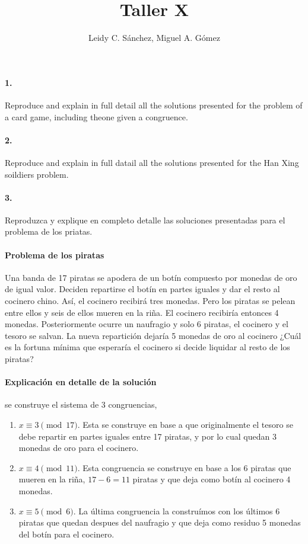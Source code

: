 \documentclass{article}
\begin{document}
	\title{Taller X}
	\author{Leidy C. Sánchez, Miguel A. Gómez}
	\maketitle

\paragraph{1.} Reproduce and explain in full detail all the solutions presented for the problem of a card game, including theone given a congruence.

\paragraph{2.} Reproduce and explain in full datail all the solutions presented for the Han Xing soildiers problem.

\paragraph{3.}  Reproduzca y explique en completo detalle las soluciones presentadas para el problema de los priatas.

\paragraph{Problema de los piratas} Una banda de 17 piratas se apodera de un botín compuesto por monedas de oro de igual valor. Deciden repartirse el botín en partes iguales y dar el resto al cocinero chino. Así, el cocinero recibirá tres monedas. Pero los piratas se pelean entre ellos y seis de ellos mueren en la riña. El cocinero recibiría entonces 4 monedas. Posteriormente ocurre un naufragio y solo 6 piratas, el cocinero y el tesoro se salvan. La nueva repartición dejaría 5 monedas de oro al cocinero ¿Cuál es la fortuna mínima que esperaría el cocinero si decide liquidar al resto de los piratas?

\paragraph{Explicación en detalle de la solución} se construye el sistema de 3 congruencias,

\begin{enumerate}
    \item $x \equiv 3 \pmod{17}$. Esta se construye en base a que originalmente el tesoro se debe repartir en partes iguales entre 17 piratas, y por lo cual quedan 3 monedas de oro para el cocinero.
    \item $x \equiv 4 \pmod{11}$. Esta congruencia se construye en base a los 6 piratas que mueren en la riña, $17-6 = 11$ piratas y que deja como botín al cocinero 4 monedas.
    \item $x \equiv 5 \pmod{6}$. La última congruencia la construímos con los últimos 6 piratas que quedan despues del naufragio y que deja como residuo 5 monedas del botín para el cocinero.
\end{enumerate}
\end{document}
